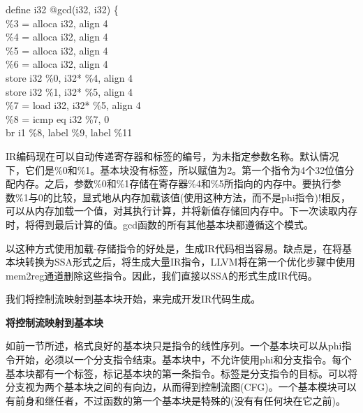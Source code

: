 \begin{tcolorbox}[colback=white,colframe=black]
define i32 @gcd(i32, i32) \{ \\
\hspace*{0.5cm}\%3 = alloca i32, align 4 \\
\hspace*{0.5cm}\%4 = alloca i32, align 4 \\
\hspace*{0.5cm}\%5 = alloca i32, align 4 \\
\hspace*{0.5cm}\%6 = alloca i32, align 4 \\
\hspace*{0.5cm}store i32 \%0, i32* \%4, align 4 \\
\hspace*{0.5cm}store i32 \%1, i32* \%5, align 4 \\
\hspace*{0.5cm}\%7 = load i32, i32* \%5, align 4 \\
\hspace*{0.5cm}\%8 = icmp eq i32 \%7, 0 \\
\hspace*{0.5cm}br i1 \%8, label \%9, label \%11
\end{tcolorbox}

IR编码现在可以自动传递寄存器和标签的编号，为未指定参数名称。默认情况下，它们是\%0和\%1。基本块没有标签，所以赋值为2。第一个指令为4个32位值分配内存。之后，参数\%0和\%1存储在寄存器\%4和\%5所指向的内存中。要执行参数\%1与0的比较，显式地从内存加载该值(使用这种方法，而不是phi指令)!相反，可以从内存加载一个值，对其执行计算，并将新值存储回内存中。下一次读取内存时，将得到最后计算的值。gcd函数的所有其他基本块都遵循这个模式。\par

以这种方式使用加载-存储指令的好处是，生成IR代码相当容易。缺点是，在将基本块转换为SSA形式之后，将生成大量IR指令，LLVM将在第一个优化步骤中使用mem2reg通道删除这些指令。因此，我们直接以SSA的形式生成IR代码。\par

我们将控制流映射到基本块开始，来完成开发IR代码生成。\par

\hspace*{\fill} \par %
\textbf{将控制流映射到基本块}

如前一节所述，格式良好的基本块只是指令的线性序列。一个基本块可以从phi指令开始，必须以一个分支指令结束。基本块中，不允许使用phi和分支指令。每个基本块都有一个标签，标记基本块的第一条指令。标签是分支指令的目标。可以将分支视为两个基本块之间的有向边，从而得到控制流图(CFG)。一个基本模块可以有前身和继任者，不过函数的第一个基本块是特殊的(没有有任何块在它之前)。\par

